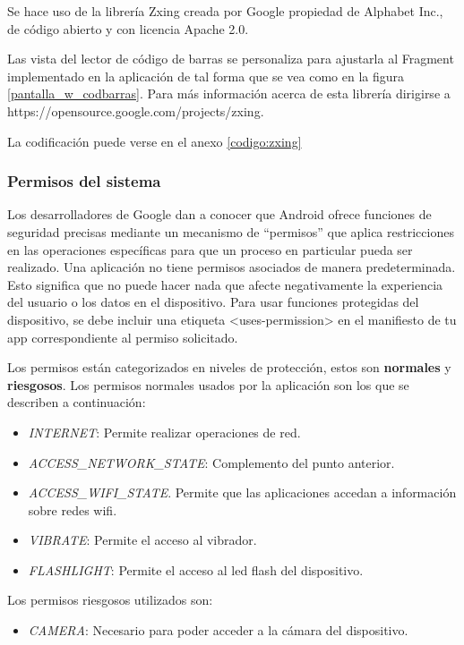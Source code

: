 Se hace uso de la librería Zxing creada por Google propiedad de Alphabet Inc., de código abierto y con licencia Apache 2.0.

Las vista del lector de código de barras se personaliza para ajustarla al Fragment implementado en la aplicación de tal forma que se vea como en la figura \ref{pantalla_w_codbarras}. Para más información acerca de esta librería dirigirse a https://opensource.google.com/projects/zxing.

La codificación puede verse en el anexo \ref{codigo:zxing}

\subsubsection{Permisos del sistema}

Los desarrolladores de Google \parencite{PermisosGoogle} dan a conocer que Android ofrece funciones de seguridad precisas mediante un mecanismo de “permisos” que aplica restricciones en las operaciones específicas para que un proceso en particular pueda ser realizado. Una aplicación no tiene permisos asociados de manera predeterminada. Esto significa que no puede hacer nada que afecte negativamente la experiencia del usuario o los datos en el dispositivo. Para usar funciones protegidas del dispositivo, se debe incluir una etiqueta <uses-permission> en el manifiesto de tu app correspondiente al permiso solicitado.

Los permisos están categorizados en niveles de protección, estos son \textbf{normales} y \textbf{riesgosos}. Los permisos normales usados por la aplicación son los que se describen a continuación:

\begin{itemize}
	\item \textit{INTERNET}: Permite realizar operaciones de red.
	\item \textit{ACCESS\_NETWORK\_STATE}: Complemento del punto anterior.
	\item \textit{ACCESS\_WIFI\_STATE}. Permite que las aplicaciones accedan a información sobre redes wifi.
	\item \textit{VIBRATE}: Permite el acceso al vibrador.
	\item \textit{FLASHLIGHT}: Permite el acceso al led flash del dispositivo.
\end{itemize}

Los permisos riesgosos utilizados son:

\begin{itemize}
	\item \textit{CAMERA}: Necesario para poder acceder a la cámara del dispositivo.
\end{itemize}


